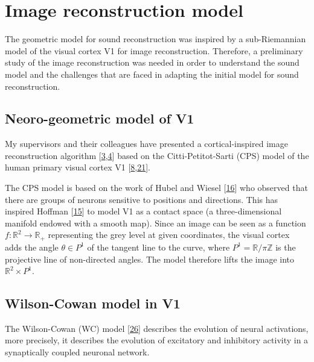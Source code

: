 \documentclass[american,]{article}
\theoremstyle{definition}
\theoremstyle{definition}
\theoremstyle{definition}
\theoremstyle{remark}
\begin{document}
\pagebreak

\hypertarget{image-reconstruction-model}{%
\section{Image reconstruction model}\label{image-reconstruction-model}}

The geometric model for sound reconstruction was inspired by
a sub-Riemannian model of the visual cortex V1 for image reconstruction.
Therefore, a preliminary study of the image reconstruction was needed
in order to understand the sound model and the challenges that are
faced in adapting the initial model for sound reconstruction.

\hypertarget{neoro-geometric-model-of-v1}{%
\subsection{Neoro-geometric model of V1}\label{neoro-geometric-model-of-v1}}

My supervisors and their colleagues have presented a cortical-inspired
image reconstruction algorithm {[}\protect\hyperlink{ref-bertalmio2018}{3},\protect\hyperlink{ref-boscain2017}{4}{]} based
on the Citti-Petitot-Sarti (CPS) model of the human primary visual cortex V1 {[}\protect\hyperlink{ref-citti2006}{8},\protect\hyperlink{ref-petitot1999}{21}{]}.

The CPS model is based on the work of Hubel and Wiesel {[}\protect\hyperlink{ref-hubel1959}{16}{]} who observed that there are
groups of neurons sensitive to positions and directions.
This has inspired Hoffman {[}\protect\hyperlink{ref-hoffman1989}{15}{]} to model V1 as a contact space
(a three-dimensional manifold endowed with a smooth map).
Since an image can be seen as a function \(f:\mathbb{R}^2\rightarrow\mathbb{R}_+\) representing
the grey level at given coordinates, the visual cortex adds
the angle \(\theta\in P^1\) of the tangent line to the curve,
where \(P^1=\mathbb{R}/\pi\mathbb{Z}\) is the projective line of non-directed angles.
The model therefore lifts the image into \(\mathbb{R}^2\times P^1\).

\hypertarget{wilson-cowan-model-in-v1}{%
\subsection{Wilson-Cowan model in V1}\label{wilson-cowan-model-in-v1}}

The Wilson-Cowan (WC) model {[}\protect\hyperlink{ref-wilson1972}{26}{]} describes the evolution of neural activations,
more precisely, it describes the evolution of excitatory and inhibitory activity in
a synaptically coupled neuronal network.
\end{document}
